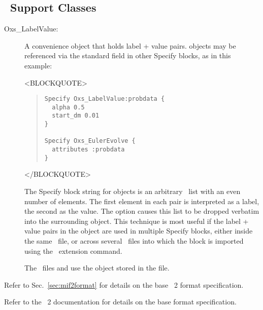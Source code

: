 \subsection{\MIF\ Support Classes}\label{oxsMIF}
\begin{description}
\item[Oxs\_LabelValue:]
%
   A convenience object that holds label + value
   pairs.   objects may be referenced via the
   standard  field in other Specify blocks, as in
   this example:
\begin{rawhtml}
<BLOCKQUOTE>
\end{rawhtml}
\begin{quote}
\begin{verbatim}
Specify Oxs_LabelValue:probdata {
  alpha 0.5
  start_dm 0.01
}

Specify Oxs_EulerEvolve {
  attributes :probdata
}
\end{verbatim}
\end{quote}
\begin{rawhtml}
</BLOCKQUOTE>
\end{rawhtml}
   The Specify block string for  objects is an
   arbitrary \Tcl\ list with an even number of elements.  The first
   element in each pair is interpreted as a label, the second as the
   value.  The  option causes this list to be dropped
   verbatim into the surrounding object.  This technique is most useful
   if the label + value pairs in the  object are
   used in multiple Specify blocks, either inside the same \MIF\
   file, or across several \MIF\ files into which the
    block is imported using the  \MIF\
   extension command.

   \begin{ExampleMifs}
     The \MIF\ files  and
      use the  object
     stored in the \fn{sample-attributes.tcl} file.
   \end{ExampleMifs}

\end{description}

Refer to Sec.~\ref{sec:mif2format} for details on the base \MIF~2
format specification.
\begin{htmlonly}
Refer to the \MIF~2 documentation for details on the base format
specification.
\end{htmlonly}

